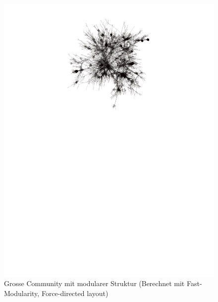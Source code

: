 \begin{figure}[h]
  \centering
  \includegraphics[scale=1.7]{images/fastmod-subgraph-large-modular-6525064ccab580a0b304a3620b197d7a.pdf}
  \caption{Grosse Community mit modularer Struktur (Berechnet mit
    Fast-Modularity, Force-directed layout)}
  \label{fig:large-community-modular}
\end{figure}

